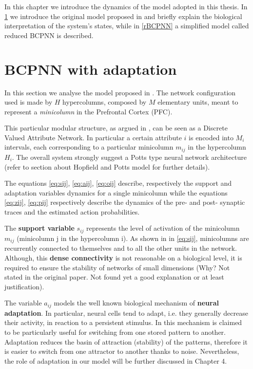 In this chapter we introduce the dynamics of the model adopted in this thesis. In \cref{bcpnn_complete} we introduce the original model proposed in \cite{LansnerFRC} and briefly explain the biological interpretation of the system's states, while in \cref{rBCPNN} a simplified model called reduced BCPNN is described.

\section{BCPNN with adaptation}
\label{bcpnn_complete}
In this section we analyse the model proposed in \cite{LansnerFRC}. The network configuration used is made by $H$ hypercolumns, composed by $M$ elementary units, meant to represent a \textit{minicolumn} in the Prefrontal Cortex (PFC).

This particular modular structure, as argued in \cite[Chapter~3.3.2]{sandberg2003bayesian}, can be seen as a Discrete Valued Attribute Network. In particular a certain attribute $i$ is encoded into $M_i$ intervals, each corresponding to a particular minicolumn $m_{ij}$ in the hypercolumn $H_i$. The overall system strongly suggest a Potts type neural network architecture (refer to section about Hopfield and Potts model for further details).

\iffalse
\begin{figure}
\centering
  \texttt{[image: myPictureName.png]}%
  \caption{High level organization of the Discrete Valued Attribute Network BCPNN}
\end{figure}
\fi
The equations \eqref{eq:sij}, \eqref{eq:aij}, \eqref{eq:oij} describe, respectively the support and adaptation variables dynamics for a single minicolumn while the equations \eqref{eq:zij}, \eqref{eq:pij} respectively describe the dynamics of the pre- and post- synaptic traces and the estimated action probabilities. 

The\textbf{ support variable} $s_{ij}$ represents the level of activation of the minicolumn $m_{ij}$ (minicolumn j in the hypercolumn i). As shown in in \eqref{eq:sij}, minicolumns are recurrently connected to themselves and to all the other units in the network. Although, this \textbf{dense connectivity} is not reasonable on a biological level, it is required to ensure the stability of networks of small dimensions (Why? Not stated in the original paper. Not found yet a good explanation or at least justification)\cite{LansnerFRC}. 

The variable $a_{ij}$ models the well known biological mechanism of \textbf{neural adaptation}. In particular, neural cells tend to adapt, i.e. they generally decrease their activity, in reaction to a persistent stimulus. In \cite[Chapter~5]{sandberg2003working} this mechanism is claimed to be particularly useful for switching from one stored pattern to another. Adaptation reduces the basin of attraction (stability) of the patterns, therefore it is easier to switch from one attractor to another thanks to noise. Nevertheless, the role of adaptation in our model will be further discussed in Chapter 4.

